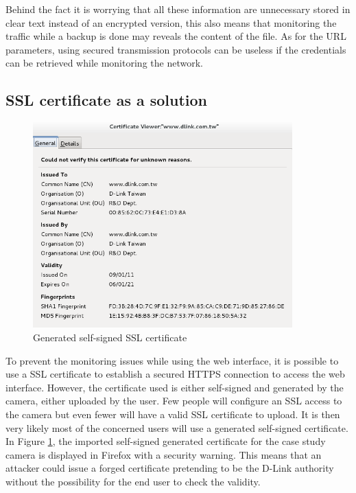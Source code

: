 Behind the fact it is worrying that all these information are unnecessary stored in clear text instead of an encrypted version, this also means that monitoring the traffic while a backup is done may reveals the content of the file.
As for the URL parameters, using secured transmission protocols can be useless if the credentials can be retrieved while monitoring the network.

\subsection{SSL certificate as a solution}

\begin{figure}[h]
  \centering
  \includegraphics[width=10cm]{images/dcs-ssl.png}
  \caption{Generated self-signed SSL certificate}
  \label{fig:dcs-ssl}
\end{figure}

To prevent the monitoring issues while using the web interface, it is possible to use a SSL certificate to establish a secured HTTPS connection to access the web interface.
However, the certificate used is either self-signed and generated by the camera, either uploaded by the user.
Few people will configure an SSL access to the camera but even fewer will have a valid SSL certificate to upload.
It is then very likely most of the concerned users will use a generated self-signed certificate.\\

In Figure \ref{fig:dcs-ssl}, the imported self-signed generated certificate for the case study camera is displayed in Firefox with a security warning.
This means that an attacker could issue a forged certificate pretending to be the D-Link authority without the possibility for the end user to check the validity.


